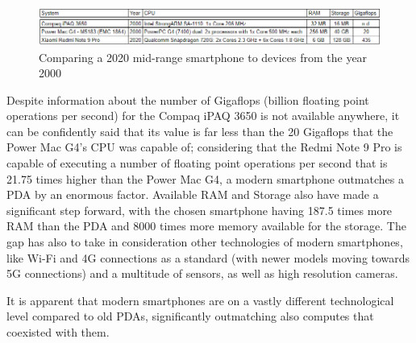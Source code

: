 \begin{figure}[!ht]
    \centering
    \includegraphics[scale=0.85]{document/chapters/chapter_1/images/three_systems_comparison.png}
    \caption{Comparing a 2020 mid-range smartphone to devices from the year 2000}
    \label{fig:three_systems_comparison}
\end{figure}

Despite information about the number of Gigaflops (billion floating point operations per second) for the Compaq iPAQ 3650 is not available anywhere, it can be confidently said that its value is far less than the 20 Gigaflops that the Power Mac G4's CPU was capable of; considering that the Redmi Note 9 Pro is capable of executing a number of floating point operations per second that is 21.75 times higher than the Power Mac G4, a modern smartphone outmatches a PDA by an enormous factor. Available RAM and Storage also have made a significant step forward, with the chosen smartphone having 187.5 times more RAM than the PDA and 8000 times more memory available for the storage. The gap has also to take in consideration other technologies of modern smartphones, like Wi-Fi and 4G connections as a standard (with newer models moving towards 5G connections) and a multitude of sensors, as well as high resolution cameras. 

It is apparent that modern smartphones are on a vastly different technological level compared to old PDAs, significantly outmatching also computes that coexisted with them.
